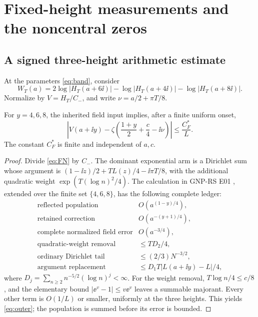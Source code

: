 \section{Fixed-height measurements and the noncentral zeros}\label{sec:fixed}

\subsection{A signed three-height arithmetic estimate}

At the parameters \eqref{eq:band}, consider
\begin{equation}\label{eq:threeheight}
 W_T(a)=2\log|H_T(a+6\ii)|
              -\log|H_T(a+4\ii)|-\log|H_T(a+8\ii)|.
\end{equation}
Normalize by \(V=H_T/C_-\), and write
\(\nu=a/2+\pi T/8\).

\begin{lemma}\label{lem:outer}
For \(y=4,6,8\), the inherited field input implies, after a finite
uniform onset,
\begin{equation}\label{eq:outer}
 \left|V(a+\ii y)-
 \zeta\left(\frac{1+y}{2}+\frac c4-\ii\nu\right)\right|
 \le\frac{C_F^*}{L}.
\end{equation}
The constant \(C_F^*\) is finite and independent of \(a,c\).
\end{lemma}
\begin{proof}
Divide \eqref{eq:FN} by \(C_-\). The dominant exponential arm is a
Dirichlet sum whose argument is
\((1-\ii z)/2+T L(z)/4-\ii\pi T/8\), with the additional quadratic
weight \(\exp(T(\log n)^2/4)\).
The calculation in GNP-RS E01 \cite{gnpe01}, extended over the finite
set \(\{4,6,8\}\), has the following complete ledger:
\[
\begin{array}{ll}
\text{reflected population}&O(a^{(1-y)/4}),\\
\text{retained correction}&O(a^{-(y+1)/4}),\\
\text{complete normalized field error}&O(a^{-3/4}),\\
\text{quadratic-weight removal}&\le T D_2/4,\\
\text{ordinary Dirichlet tail}&\le(2/3)N^{-3/2},\\
\text{argument replacement}&\le D_1T|L(a+\ii y)-L|/4,
\end{array}
\]
where \(D_j=\sum_{n\ge2}n^{-5/2}(\log n)^j<\infty\).
For the weight removal, \(T\log n/4\le c/8\), and the elementary
bound \(|\ee^v-1|\le v\ee^v\) leaves a summable majorant.
Every other term is \(O(1/L)\) or smaller, uniformly at the three
heights. This yields \eqref{eq:outer}; the population is summed before
its error is bounded.
\end{proof}

